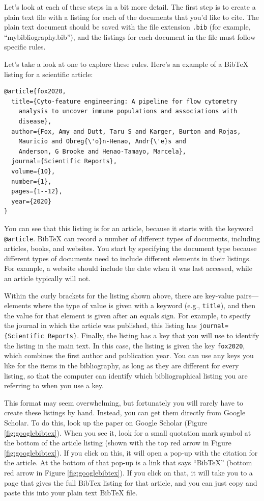 \documentclass[]{tufte-book}
\begin{document}
Let's look at each of these steps in a bit more detail. The first step is
to create a plain text file with a listing for each of the documents that
you'd like to cite. The plain text document should be saved with the file
extension \texttt{.bib} (for example, ``mybibliography.bib''), and the listings for
each document in the file must follow specific rules.

Let's take a look at one to explore these rules. Here's an example of a BibTeX
listing for a scientific article:

\begin{verbatim}
@article{fox2020,
  title={Cyto-feature engineering: A pipeline for flow cytometry 
    analysis to uncover immune populations and associations with 
    disease},
  author={Fox, Amy and Dutt, Taru S and Karger, Burton and Rojas, 
    Mauricio and Obreg{\'o}n-Henao, Andr{\'e}s and 
    Anderson, G Brooke and Henao-Tamayo, Marcela},
  journal={Scientific Reports},
  volume={10},
  number={1},
  pages={1--12},
  year={2020}
}
\end{verbatim}

You can see that this listing is for an article, because it starts with the
keyword \texttt{@article}. BibTeX can record a number of different types of documents,
including articles, books, and websites. You start by specifying the document
type because different types of documents need to include different elements
in their listings. For example, a website should include the date when it was
last accessed, while an article typically will not.

Within the curly brackets for the listing shown above, there are key-value
pairs---elements where the type of value is given with a keyword (e.g.,
\texttt{title}), and then the value for that element is given after an equals sign.
For example, to specify the journal in which the article was published, this
listing has \texttt{journal=\{Scientific\ Reports\}}. Finally, the listing has a key
that you will use to identify the listing in the main text. In this case,
the listing is given the key \texttt{fox2020}, which combines the first author and
publication year. You can use any keys you like for the items in the bibliography,
as long as they are different for every listing, so that the computer can
identify which bibliographical listing you are referring to when you use a key.

This format may seem overwhelming, but fortunately you will rarely have to
create these listings by hand. Instead, you can get them directly from Google
Scholar. To do this, look up the paper on Google Scholar (Figure
\ref{fig:googlebibtex}). When you see it, look for a small quotation mark
symbol at the bottom of the article listing (shown with the top red arrow in
Figure \ref{fig:googlebibtex}). If you click on this, it will open a pop-up
with the citation for the article. At the bottom of that pop-up is a link that
says ``BibTeX'' (bottom red arrow in Figure \ref{fig:googlebibtex}). If you click
on that, it will take you to a page that gives the full BibTex listing for that
article, and you can just copy and paste this into your plain text BibTeX file.
\end{document}
